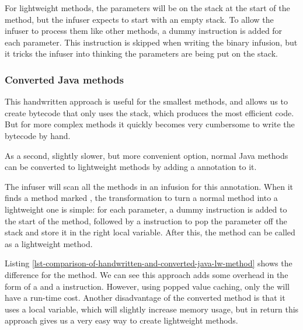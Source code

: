 For lightweight methods, the parameters will be on the stack at the start of the method, but the infuser expects to start with an empty stack. To allow the infuser to process them like other methods, a dummy  instruction is added for each parameter. This instruction is skipped when writing the binary infusion, but it tricks the infuser into thinking the parameters are being put on the stack.

\subsubsection{Converted Java methods}
This handwritten approach is useful for the smallest methods, and allows us to create bytecode that only uses the stack, which produces the most efficient code. But for more complex methods it quickly becomes very cumbersome to write the bytecode by hand.

As a second, slightly slower, but more convenient option, normal Java methods can be converted to lightweight methods by adding a  annotation to it.

The infuser will scan all the methods in an infusion for this annotation. When it finds a method marked , the transformation to turn a normal method into a lightweight one is simple: for each parameter, a dummy  instruction is added to the start of the method, followed by a  instruction to pop the parameter off the stack and store it in the right local variable. After this, the method can be called as a lightweight method.

Listing \ref{lst-comparison-of-handwritten-and-converted-java-lw-method} shows the difference for the  method. We can see this approach adds some overhead in the form of a  and a  instruction. However, using popped value caching, only the  will have a run-time cost. Another disadvantage of the converted method is that it uses a local variable, which will slightly increase memory usage, but in return this approach gives us a very easy way to create lightweight methods.

